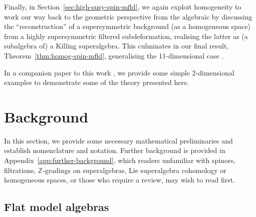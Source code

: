 \documentclass[10pt,a4paper]{amsart}
\numberwithin{equation}{section}
\newcommand{\ZZ}{\mathbb{Z}}
\newcommand{\1}{\mathbbm{1}}
\begin{document}
Finally, in Section~\ref{sec:high-susy-spin-mfld}, we again exploit homogeneity to work our way back to the geometric perspective from the algebraic by discussing the ``reconstruction'' of a supersymmetric background (as a homogeneous space) from a highly supersymmetric filtered subdeformation, realising the latter as (a subalgebra of) a Killing superalgebra. This culminates in our final result, Theorem~\ref{thm:homog-spin-mfld}, generalising the 11-dimensional case \cite[Theorem~13]{Figueroa-OFarrill2017_1}.

In a companion paper to this work \cite{Beckett2024_3}, we provide some simple 2-dimensional examples to demonstrate some of the theory presented here.

\section{Background}
\label{sec:background}

In this section, we provide some necessary mathematical preliminaries and establish nomenclature and notation. Further background is provided in Appendix~\ref{app:further-background}, which readers unfamiliar with spinors, filtrations, $\ZZ$-gradings on superalgebras, Lie superalgebra cohomology or homogeneous spaces, or those who require a review, may wish to read first.

\subsection{Flat model algebras}
\label{sec:flat-model-algs}
\end{document}
